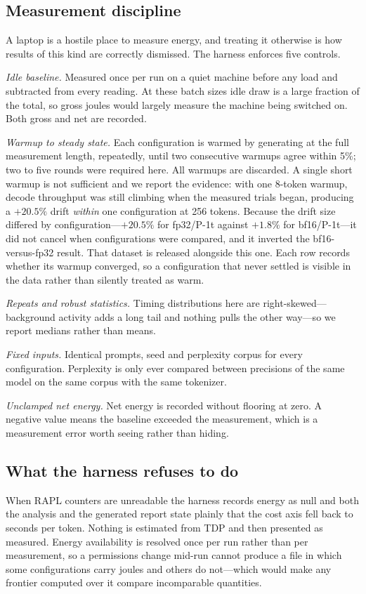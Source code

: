 \documentclass[journal]{IEEEtran}
\begin{document}
\subsection{Measurement discipline}
A laptop is a hostile place to measure energy, and treating it otherwise is how
results of this kind are correctly dismissed. The harness enforces five
controls.

\emph{Idle baseline.} Measured once per run on a quiet machine before any load
and subtracted from every reading. At these batch sizes idle draw is a large
fraction of the total, so gross joules would largely measure the machine being
switched on. Both gross and net are recorded.

\emph{Warmup to steady state.} Each configuration is warmed by generating at
the full measurement length, repeatedly, until two consecutive warmups agree
within 5\%; two to five rounds were required here. All warmups are discarded.
A single short warmup is not sufficient and we report the evidence: with one
8-token warmup, decode throughput was still climbing when the measured trials
began, producing a $+20.5\%$ drift \emph{within} one configuration at 256
tokens. Because the drift size differed by configuration---$+20.5\%$ for
fp32/P-1t against $+1.8\%$ for bf16/P-1t---it did not cancel when
configurations were compared, and it inverted the bf16-versus-fp32 result. That
dataset is released alongside this one. Each row records whether its warmup
converged, so a configuration that never settled is visible in the data rather
than silently treated as warm.

\emph{Repeats and robust statistics.} Timing distributions here are
right-skewed---background activity adds a long tail and nothing pulls the other
way---so we report medians rather than means.

\emph{Fixed inputs.} Identical prompts, seed and perplexity corpus for every
configuration. Perplexity is only ever compared between precisions of the same
model on the same corpus with the same tokenizer.

\emph{Unclamped net energy.} Net energy is recorded without flooring at zero. A
negative value means the baseline exceeded the measurement, which is a
measurement error worth seeing rather than hiding.

\subsection{What the harness refuses to do}
When RAPL counters are unreadable the harness records energy as null and both
the analysis and the generated report state plainly that the cost axis fell
back to seconds per token. Nothing is estimated from TDP and then presented as
measured. Energy availability is resolved once per run rather than per
measurement, so a permissions change mid-run cannot produce a file in which
some configurations carry joules and others do not---which would make any
frontier computed over it compare incomparable quantities.
\end{document}
